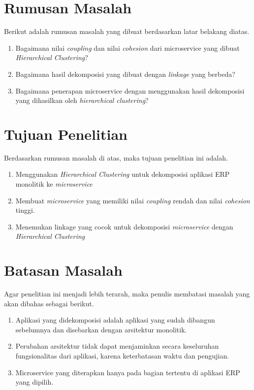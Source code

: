 \hfill \break

\section{Rumusan Masalah}
Berikut adalah rumusan masalah yang dibuat berdasarkan latar belakang diatas.
\begin{enumerate}[nolistsep,leftmargin=0.5cm]
  \item Bagaimana nilai \textit{coupling} dan nilai \textit{cohesion} dari microservice yang dibuat \textit{Hierarchical Clustering}?
  \item Bagaimana hasil dekomposisi yang dibuat dengan \textit{linkage} yang berbeda?
  \item Bagaimana penerapan microservice dengan menggunakan hasil dekomposisi yang dihasilkan oleh \textit{hierarchical clustering}?\\
\end{enumerate}

\section{Tujuan Penelitian}
Berdasarkan rumusan masalah di atas, maka tujuan penelitian ini adalah.
\begin{enumerate}[nolistsep,leftmargin=0.5cm]
  \item Menggunakan \textit{Hierarchical Clustering} untuk dekomposisi aplikasi ERP monolitik ke \textit{microservice}
  \item Membuat \textit{microservice} yang memiliki nilai \textit{coupling} rendah dan nilai \textit{cohesion} tinggi.
  \item Menemukan linkage yang  cocok untuk dekomposisi \textit{microservice} dengan \textit{Hierarchical Clustering} \\
\end{enumerate}

\section{Batasan Masalah}
Agar penelitian ini menjadi lebih terarah, maka penulis membatasi masalah yang akan dibahas sebagai berikut.
\begin{enumerate}[nolistsep,leftmargin=0.5cm]
  \item Aplikasi yang didekomposisi adalah aplikasi yang sudah dibangun sebelumnya dan disebarkan dengan arsitektur monolitik.
  \item Perubahan arsitektur tidak dapat menjaminkan secara keseluruhan fungsionalitas dari aplikasi, karena keterbatasan waktu dan pengujian.
  \item Microservice yang diterapkan hanya pada bagian tertentu di aplikasi ERP yang dipilih.\\
\end{enumerate}

